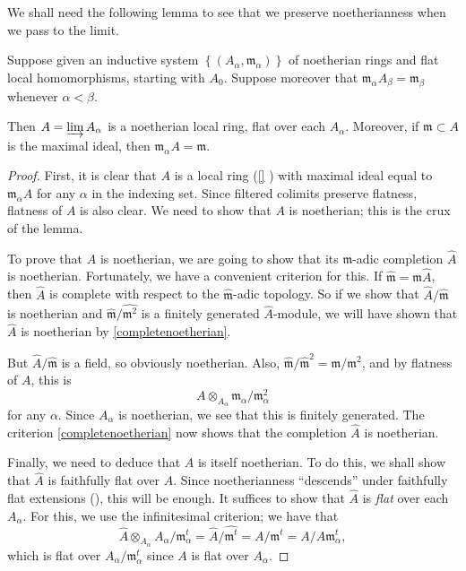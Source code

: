 
We shall need the following lemma to see that we preserve noetherianness when
we pass to the limit.
\begin{lemma} 
Suppose given an inductive system $\left\{(A_\alpha,
\mathfrak{m}_{\alpha})\right\}$ of noetherian
rings and flat local homomorphisms, starting with $A_0$.
Suppose moreover that $\mathfrak{m}_{\alpha} A_{\beta} = \mathfrak{m}_{\beta}$
whenever $\alpha < \beta$.

Then $A = \varinjlim A_\alpha$ is a
noetherian local ring, flat over each $A_\alpha$. Moreover, if $\mathfrak{m} \subset A$
is the maximal ideal, then $\mathfrak{m}_\alpha A = \mathfrak{m}$.
\end{lemma}
\begin{proof} 
First, it is clear that $A$ is a local ring (\cref{} ) with
maximal ideal equal to $\mathfrak{m}_\alpha A$ for any $\alpha $ in the
indexing set. Since filtered colimits preserve flatness, flatness of $A$ is
also clear. 
We need to show that $A$ is noetherian; this is the crux of the lemma. 

To prove that $A$ is noetherian, we are going to show that its
$\mathfrak{m}$-adic completion $\hat{A}$ is noetherian. Fortunately, we have a
convenient criterion for this. If $\hat{\mathfrak{m}}=
\mathfrak{m}\hat{A}$, then $\hat{A}$ is complete with respect to the
$\hat{\mathfrak{m}}$-adic topology. So if we show that
$\hat{A}/\hat{\mathfrak{m}}$ is noetherian and
$\hat{\mathfrak{m}}/\hat{\mathfrak{m}^2}$ is a finitely generated
$\hat{A}$-module, we will have shown that $\hat{A}$ is noetherian by
\cref{completenoetherian}.

But $\hat{A}/\hat{\mathfrak{m}}$ is a field, so obviously noetherian. 
Also, $\hat{\mathfrak{m}}/\hat{\mathfrak{m}}^2 = \mathfrak{m}/\mathfrak{m}^2$,
and by flatness of $A$, this is 
\[ A \otimes_{A_\alpha} \mathfrak{m}_\alpha/\mathfrak{m}_\alpha^2  \]
for any $\alpha$. Since $A_\alpha$ is noetherian, we see that this is finitely
generated. The criterion \cref{completenoetherian} now shows that the completion $\hat{A}$ is
noetherian.

Finally, we need to deduce that $A$ is itself noetherian. 
To do this,
we shall show that $\hat{A}$ is faithfully flat over $A$. Since noetherianness
``descends'' under faithfully flat extensions (), this
will be enough. It suffices to show that $\hat{A}$ is \emph{flat} over each
$A_\alpha$. For this, we use the infinitesimal criterion; we have that
\[ \hat{A} \otimes_{A_\alpha} A_\alpha/\mathfrak{m}_\alpha^t =
\hat{A}/\hat{\mathfrak{m}^t} = A/\mathfrak{m}^t = A/A\mathfrak{m}_\alpha^t,  \]
which is flat over $A_\alpha/\mathfrak{m}_\alpha^t$ since $A$ is flat over
$A_\alpha$.


\end{proof}
